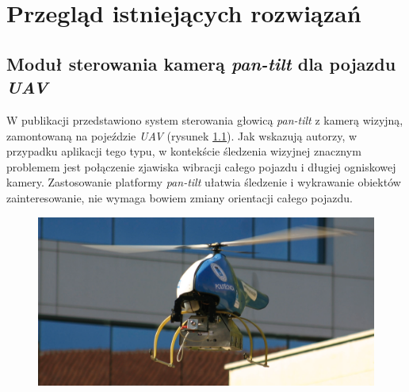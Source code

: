 \chapter{Przegląd istniejących rozwiązań}
\label{cha:Przeglad_istniejacych_rozwiazan}


\section{Moduł sterowania kamerą \textit{pan-tilt} dla pojazdu \textit{UAV}}
\label{sec:Przyklad_Olivares-Mendez2009}

W publikacji \cite{Olivares-Mendez2009} przedstawiono system sterowania głowicą \textit{pan-tilt} z kamerą wizyjną, zamontowaną na pojeździe \textit{UAV} (rysunek \ref{fig:UAV_Olivares_Mendez}). Jak wskazują autorzy, w przypadku aplikacji tego typu, w kontekście śledzenia wizyjnej znacznym problemem jest połączenie zjawiska wibracji całego pojazdu i długiej ogniskowej kamery. Zastosowanie platformy \textit{pan-tilt} ułatwia śledzenie i wykrawanie obiektów zainteresowanie, nie wymaga bowiem zmiany orientacji całego pojazdu.
\begin{figure}[!htb]
	\begin{center}
		\includegraphics[width=12cm]{images/uav_olivares_mendez.png}
	\end{center}	
\label{fig:UAV_Olivares_Mendez}
\end{figure}

